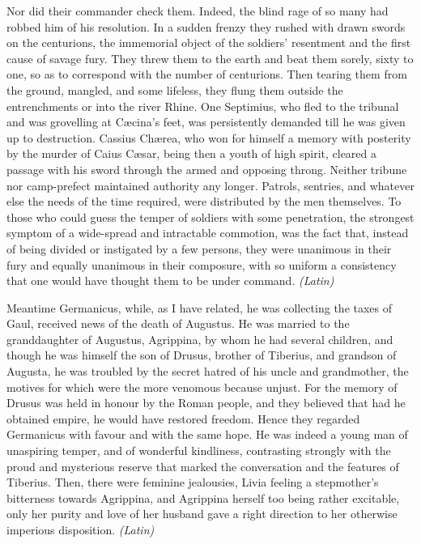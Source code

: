 Nor did their commander check them. Indeed, the blind rage of so many had robbed him of his resolution. In a sudden frenzy they rushed with drawn swords on the centurions, the immemorial object of the soldiers' resentment and the first cause of savage fury. They threw them to the earth and beat them sorely, sixty to one, so as to correspond with the number of centurions. Then tearing them from the ground, mangled, and some lifeless, they flung them outside the entrenchments or into the river Rhine. One Septimius, who fled to the tribunal and was grovelling at Cæcina's feet, was persistently demanded till he was given up to destruction. Cassius Chærea, who won for himself a memory with posterity by the murder of Caius Cæsar, being then a youth of high spirit, cleared a passage with his sword through the armed and opposing throng. Neither tribune nor camp-prefect maintained authority any longer. Patrols, sentries, and whatever else the needs of the time required, were distributed by the men themselves. To those who could guess the temper of soldiers with some penetration, the strongest symptom of a wide-spread and intractable commotion, was the fact that, instead of being divided or instigated by a few persons, they were unanimous in their fury and equally unanimous in their composure, with so uniform a consistency that one would have thought them to be under command. \emph{(Latin)}


Meantime Germanicus, while, as I have related, he was collecting the taxes of Gaul, received news of the death of Augustus. He was married to the granddaughter of Augustus, Agrippina, by whom he had several children, and though he was himself the son of Drusus, brother of Tiberius, and grandson of Augusta, he was troubled by the secret hatred of his uncle and grandmother, the motives for which were the more venomous because unjust. For the memory of Drusus was held in honour by the Roman people, and they believed that had he obtained empire, he would have restored freedom. Hence they regarded Germanicus with favour and with the same hope. He was indeed a young man of unaspiring temper, and of wonderful kindliness, contrasting strongly with the proud and mysterious reserve that marked the conversation and the features of Tiberius. Then, there were feminine jealousies, Livia feeling a stepmother's bitterness towards Agrippina, and Agrippina herself too being rather excitable, only her purity and love of her husband gave a right direction to her otherwise imperious disposition. \emph{(Latin)}

